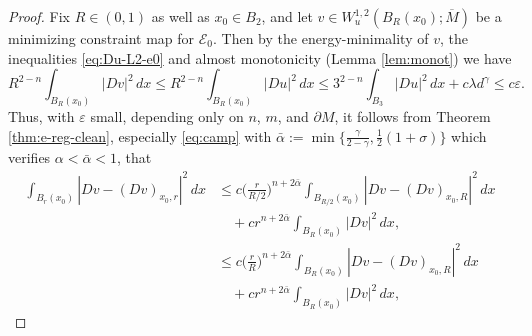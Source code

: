\documentclass[11pt]{amsart}
\newcommand{\cE}{{\mathcal E}}
\newcommand{\e}{\varepsilon}
\theoremstyle{plain}
\theoremstyle{definition}
\theoremstyle{remark}
\numberwithin{equation}{section}
\begin{document}
\begin{proof}
Fix ${R} \in (0,1)$ as well as $x_0\in   B_2$, and let $v \in W_u^{1,2}(B_{R}(x_0);\overline M)$ be a minimizing constraint map for $\cE_0$. Then by  the energy-minimality of $v$, the inequalities \eqref{eq:Du-L2-e0} and almost monotonicity (Lemma \ref{lem:monot}) we have 
\begin{equation}
    \label{eq:Dv-L2-e0}
    R^{2-n}\int_{B_R(x_0)} |Dv|^2\,dx \leq R^{2-n}\int_{B_R(x_0)} |Du|^2\,dx \leq 3^{2-n} \int_{ B_3} |Du|^2\,dx + c{\lambda} d^\gamma \leq c{\e}.
\end{equation}
Thus, with ${\e}$ small, depending only on $n$, $m$, and $\partial M$, it follows from Theorem \ref{thm:e-reg-clean}, especially \eqref{eq:camp} with $\bar\alpha := \min\{\frac{\gamma}{2-\gamma},\frac{1}{2}(1 +\sigma)\}$ which verifies $\alpha < \bar\alpha < 1$, that  
\begin{equation}
    \label{eq:v-C11-re}
    \begin{aligned}
        \int_{B_r(x_0)} |Dv - (Dv)_{x_0,r}|^2\,dx &\leq c\bigg(\frac{r}{R/2}\bigg)^{n+2\bar\alpha}\int_{B_{R/2}(x_0)} |Dv - (Dv)_{x_0,{R}}|^2\,dx \\
        &\quad+ cr^{n+2\bar\alpha}\int_{B_R(x_0)} |Dv|^2\,dx, \\
        &\leq c\bigg(\frac{r}{R}\bigg)^{n+2\bar\alpha}\int_{B_{R}(x_0)} |Dv - (Dv)_{x_0,{R}}|^2\,dx \\
        &\quad+ cr^{n+2\bar\alpha}\int_{B_R(x_0)} |Dv|^2\,dx,
    \end{aligned}
 \end{equation} 


\end{proof}
\end{document}
